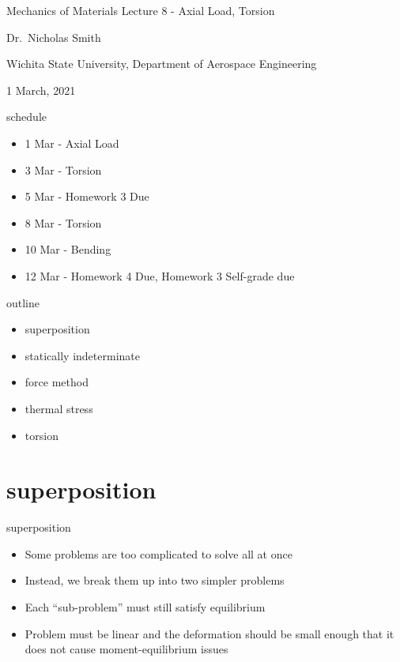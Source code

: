 \documentclass[
  letterpaper,
  ignorenonframetext,
  aspectratio=43,
  handout,
  12pt]{beamer}
\author{}
\date{}
\providecommand{\tightlist}{%
  \setlength{\itemsep}{0pt}\setlength{\parskip}{0pt}}
\providecommand{\tightlist}{%
\setlength{\itemsep}{0pt}\setlength{\parskip}{0pt}}
\begin{document}
\begin{frame}{Mechanics of Materials}
\protect\hypertarget{mechanics-of-materials}{}
Lecture 8 - Axial Load, Torsion

Dr.~Nicholas Smith

Wichita State University, Department of Aerospace Engineering

1 March, 2021
\end{frame}

\begin{frame}{schedule}
\protect\hypertarget{schedule}{}
\begin{itemize}
\tightlist
\item
  1 Mar - Axial Load
\item
  3 Mar - Torsion
\item
  5 Mar - Homework 3 Due
\item
  8 Mar - Torsion
\item
  10 Mar - Bending
\item
  12 Mar - Homework 4 Due, Homework 3 Self-grade due
\end{itemize}
\end{frame}

\begin{frame}{outline}
\protect\hypertarget{outline}{}
\begin{itemize}
\tightlist
\item
  superposition
\item
  statically indeterminate
\item
  force method
\item
  thermal stress
\item
  torsion
\end{itemize}
\end{frame}

\hypertarget{superposition}{%
\section{superposition}\label{superposition}}

\begin{frame}{superposition}
\protect\hypertarget{superposition-1}{}
\begin{itemize}
\tightlist
\item
  Some problems are too complicated to solve all at once
\item
  Instead, we break them up into two simpler problems
\item
  Each ``sub-problem'' must still satisfy equilibrium
\item
  Problem must be linear and the deformation should be small enough that
  it does not cause moment-equilibrium issues
\end{itemize}
\end{frame}
\end{document}
